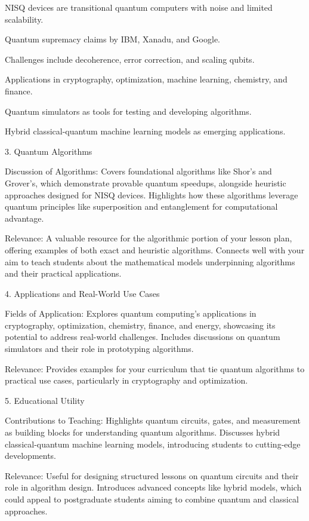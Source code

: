 NISQ devices are transitional quantum computers with noise and limited scalability.

Quantum supremacy claims by IBM, Xanadu, and Google.

Challenges include decoherence, error correction, and scaling qubits.

Applications in cryptography, optimization, machine learning, chemistry, and finance.

Quantum simulators as tools for testing and developing algorithms.

Hybrid classical-quantum machine learning models as emerging applications.

3. Quantum Algorithms

Discussion of Algorithms:
Covers foundational algorithms like Shor’s and Grover’s, which demonstrate provable quantum speedups, alongside heuristic approaches designed for NISQ devices.
Highlights how these algorithms leverage quantum principles like superposition and entanglement for computational advantage.

Relevance:
A valuable resource for the algorithmic portion of your lesson plan, offering examples of both exact and heuristic algorithms.
Connects well with your aim to teach students about the mathematical models underpinning algorithms and their practical applications.

4. Applications and Real-World Use Cases

Fields of Application:
Explores quantum computing’s applications in cryptography, optimization, chemistry, finance, and energy, showcasing its potential to address real-world challenges.
Includes discussions on quantum simulators and their role in prototyping algorithms.

Relevance:
Provides examples for your curriculum that tie quantum algorithms to practical use cases, particularly in cryptography and optimization.

5. Educational Utility

Contributions to Teaching:
Highlights quantum circuits, gates, and measurement as building blocks for understanding quantum algorithms.
Discusses hybrid classical-quantum machine learning models, introducing students to cutting-edge developments.

Relevance:
Useful for designing structured lessons on quantum circuits and their role in algorithm design.
Introduces advanced concepts like hybrid models, which could appeal to postgraduate students aiming to combine quantum and classical approaches.


